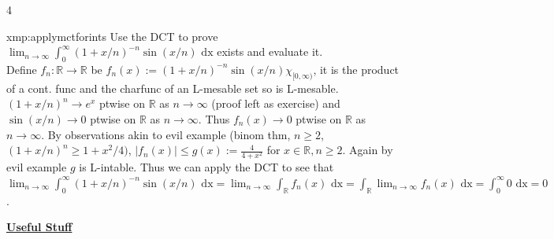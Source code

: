 \documentclass[landscape, 8pt]{extarticle}
\begin{document}
\begin{multicols*}{4}
		
		\begin{xmp}{xmp:applymctforints}{ }
			Use the DCT to prove $\lim_{n\to \infty} \int_{0}^{\infty} (1 + x/n)^{-n} \sin(x/n) \text{ dx}$ exists and evaluate it.\\
			Define $f_n: \mathbb{R}\to \mathbb{R}$ be $f_n(x):= (1 + x/n)^{-n} \sin(x/n) \chi_{[0, \infty)}$, it is the product of a cont. func and the charfunc of an L-mesable set so is L-mesable. $(1 + x/n)^n \to e^x$ ptwise on $\mathbb{R}$ as $n \to \infty$ (proof left as exercise) and $\sin(x/n) \to 0$ ptwise on $\mathbb{R}$ as $n \to \infty$. Thus $f_n(x) \to 0$ ptwise on $\mathbb{R}$ as $n \to \infty$. By observations akin to evil example (binom thm, $n \ge 2$, $(1 + x/n)^n \ge 1 + x^2/4)$, $\left|f_n(x)\right| \le g(x) := \frac{4}{4+x^2}$ for $x\in \mathbb{R}, n \ge 2$. Again by evil example $g$ is L-intable. Thus we can apply the DCT to see that $\lim_{n\to \infty} \int_{0}^{\infty} (1 + x/n)^{-n} \sin(x/n) \text{ dx} = \lim_{n\to \infty} \int_{\mathbb{R}} f_n(x) \text{ dx} = \int_{\mathbb{R}}\lim_{n\to \infty} f_n(x) \text{ dx} = \int_{0}^{\infty} 0 \text{ dx} = 0$. 
			
		\end{xmp}
		
		
		
	\columnbreak
	\vspace*{-8pt}
		
		
		{\footnotesize \textbf{\underline{Useful Stuff}}}
		
		
		

\end{multicols*}
\end{document}
